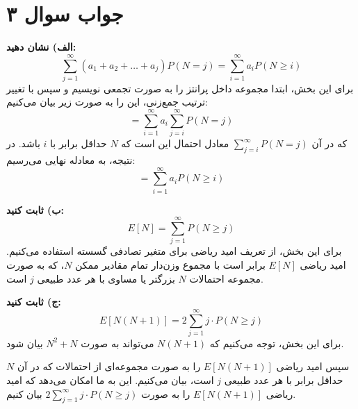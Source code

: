 \section*{جواب سوال ۳}

\textbf{الف) نشان دهید:} 
\[ \sum_{j=1}^{\infty} (a_1 + a_2 + \ldots + a_j) P(N = j) = \sum_{i=1}^{\infty} a_i P(N \geq i) \]
برای این بخش، ابتدا مجموعه داخل پرانتز را به صورت تجمعی نویسیم و سپس با تغییر ترتیب جمع‌زنی، این را به صورت زیر بیان می‌کنیم:
\[ = \sum_{i=1}^{\infty} a_i \sum_{j=i}^{\infty} P(N = j) \]
که در آن \(\sum_{j=i}^{\infty} P(N = j)\) معادل احتمال این است که \(N\) حداقل برابر با \(i\) باشد. در نتیجه، به معادله نهایی می‌رسیم:
\[ = \sum_{i=1}^{\infty} a_i P(N \geq i) \]

\textbf{ب) ثابت کنید:} 
\[ E[N] = \sum_{j=1}^{\infty} P(N \geq j) \]
برای این بخش، از تعریف امید ریاضی برای متغیر تصادفی گسسته استفاده می‌کنیم. امید ریاضی \(E[N]\) برابر است با مجموع وزن‌دار تمام مقادیر ممکن \(N\)، که به صورت مجموعه احتمالات \(N\) بزرگتر یا مساوی با هر عدد طبیعی \(j\) است.

\textbf{ج) ثابت کنید:} 
\[ E[N(N + 1)] = 2 \sum_{j=1}^{\infty} j \cdot P(N \geq j) \]
برای این بخش، توجه می‌کنیم که \(N(N + 1)\) می‌تواند به صورت \(N^2 + N\) بیان شود. 

سپس امید ریاضی \(E[N(N + 1)]\) را به صورت مجموعه‌ای از احتمالات که در آن \(N\) حداقل برابر با هر عدد طبیعی \(j\) است، بیان می‌کنیم. این به ما امکان می‌دهد که امید ریاضی \(E[N(N + 1)]\) را به صورت \(2 \sum_{j=1}^{\infty} j \cdot P(N \geq j)\) بیان کنیم.